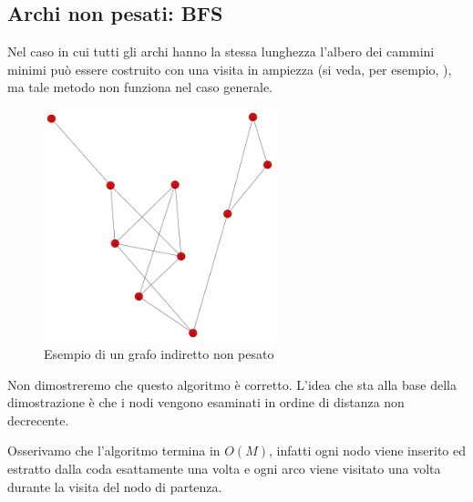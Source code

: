 \documentclass[a4paper,10pt]{amsbook}
\theoremstyle{plain}
\theoremstyle{definition}
\theoremstyle{remark}
\newcommand{\pa}[1]{\left(#1\right)}
\begin{document}
\subsection{Archi non pesati: BFS}

Nel caso in cui tutti gli archi hanno la stessa lunghezza l'albero dei
cammini minimi può essere costruito con una visita in ampiezza (si
veda, per esempio, \cite{cormen}), ma tale metodo non funziona nel
caso generale.

\begin{figure}[h]
  \centering
  \includegraphics[width=0.6\textwidth]{preBFS}
  \caption{Esempio di un grafo indiretto non pesato}
  \label{fig:preBFS}
\end{figure}


\begin{figure}[H]
  \begin{algorithmic}
      
    \EndFor
            
      
    \EndIf
    \EndFor
    \EndWhile
  \end{algorithmic}
\label{fig:BFScode}
\end{figure}
Non dimostreremo che questo algoritmo \`e corretto. L'idea che sta
alla base della dimostrazione \`e che i nodi vengono esaminati in
ordine di distanza non decrecente.

Osserivamo che l'algoritmo termina in $O\pa{M}$, infatti ogni nodo
viene inserito ed estratto dalla coda esattamente una volta e ogni
arco viene visitato una volta durante la visita del nodo di partenza.
\end{document}
